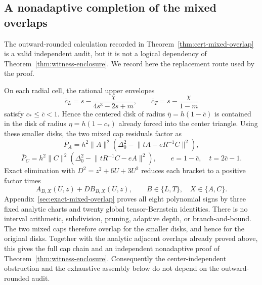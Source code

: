 \subsection{A nonadaptive completion of the mixed overlaps}
\label{sec:strategy4-nonbranching-completion}

The outward-rounded calculation recorded in
Theorem~\ref{thm:cert-mixed-overlap} is a valid independent audit, but it is
not a logical dependency of Theorem~\ref{thm:witness-enclosure}.  We record
here the replacement route used by the proof.

On each radial cell, the rational upper envelopes
\[
 \bar c_L=s-\frac{\chi}{4s^3-2s+m},
 \qquad
 \bar c_T=s-\frac{\chi}{1-m}
\]
satisfy $c_*\le\bar c<1$.  Hence the centered disk of radius
$\bar\eta=h(1-\bar c)$ is contained in the disk of radius
$\eta=h(1-c_*)$ already forced into the center triangle.  Using these smaller
disks, the two mixed cap residuals factor as
\[
 \bar P_A=h^2\lVert A\rVert^2
 \left(\Delta_0^2-\lVert tA-eR^{-1}C\rVert^2\right),
\]
\[
 \bar P_C=h^2\lVert C\rVert^2
 \left(\Delta_0^2-\lVert tR^{-1}C-eA\rVert^2\right),
 \qquad e=1-\bar c,\quad t=2\bar c-1.
\]
Exact elimination with $D^2=z^2+6U+3U^2$ reduces each bracket to a positive
factor times
\[
 A_{B,X}(U,z)+D B_{B,X}(U,z),
 \qquad B\in\{L,T\},\quad X\in\{A,C\}.
\]
Appendix~\ref{sec:exact-mixed-overlap} proves all eight polynomial signs by
three fixed analytic charts and twenty global tensor-Bernstein identities.
There is no interval arithmetic, subdivision, pruning, adaptive depth, or
branch-and-bound.  The two mixed caps therefore overlap for the smaller disks,
and hence for the original disks.  Together with the analytic adjacent
overlaps already proved above, this gives the full cap chain and an independent
nonadaptive proof of Theorem~\ref{thm:witness-enclosure}.  Consequently the
center-independent obstruction and the exhaustive assembly below do not
depend on the outward-rounded audit.
